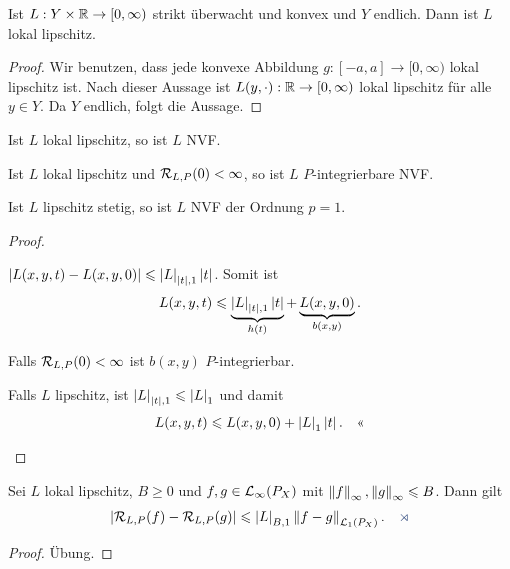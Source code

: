 \begin{lem}
\label{prop:2.1.7}
Ist $L: Y\times \mathbb{R}\to [0,\infty)$ strikt überwacht und konvex und $Y$ endlich.
Dann ist $L$ lokal lipschitz.\fishhere
\end{lem}
\begin{proof}
Wir benutzen, dass jede konvexe Abbildung $g:[-a,a]\to [0,\infty)$ lokal
lipschitz ist. Nach dieser Aussage ist $L(y,\cdot) : \mathbb{R}\to [0,\infty)$ lokal
lipschitz für alle $y\in Y$. Da $Y$ endlich, folgt die Aussage.\qedhere
\end{proof}

\begin{lem}
\label{lem:2.1.8}
\begin{propenum}
\item Ist $L$ lokal lipschitz, so ist $L$ NVF.
\item Ist $L$ lokal lipschitz und $\mathcal{R}_{L,P}(0) < \infty$, so ist $L$
$P$-integrierbare NVF.
\item Ist $L$ lipschitz stetig, so ist $L$ NVF der Ordnung $p=1$.\fishhere
\end{propenum}
\end{lem}
\begin{proof}
\begin{proofenum}
\item $\left|L(x,y,t)-L(x,y,0)\right| \leqslant \left|L\right|_{\left|t\right|,1}\left|t\right|$. Somit ist
\begin{align*}
L(x,y,t) \leqslant \underbrace{\left|L\right|_{\left|t\right|,1}\left|t\right|}_{h(t)} +
\underbrace{L(x,y,0)}_{b(x,y)}.
\end{align*}
\item Falls $\mathcal{R}_{L,P}(0) < \infty$ ist $b(x,y)$ $P$-integrierbar.
\item Falls $L$ lipschitz, ist $\left|L\right|_{\left|t\right|,1} \leqslant \left|L\right|_1$ und damit
\begin{align*}
L(x,y,t) \leqslant L(x,y,0) + \left|L\right|_1\left|t\right|.\quad\text{<<}
\end{align*}
\end{proofenum}
\end{proof}

\begin{lem}
\label{prop:2.1.9}
Sei $L$ lokal lipschitz, $B\ge 0$ und $f,g\in\mathcal{L}_\infty(P_X)$
mit $\left\|f\right\|_\infty,\left\|g\right\|_\infty \leqslant B$. Dann gilt
\begin{align*}
\abs{\RR_{L,P}(f)-\RR_{L,P}(g)} \le
\abs{L}_{B,1}\norm{f-g}_{\LL_1(P_X)}.\fishhere
\end{align*}
\end{lem}
\begin{proof}
Übung.\qedhere
\end{proof}

